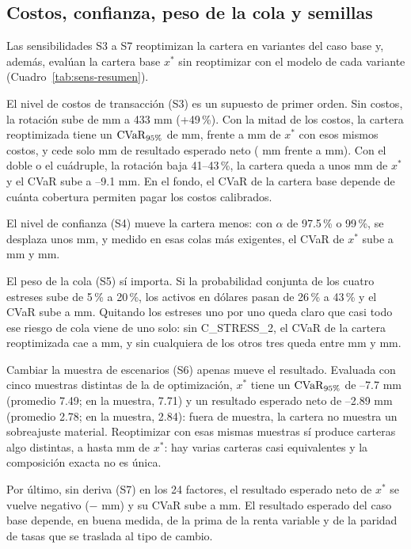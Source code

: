 

\subsection{Costos, confianza, peso de la cola y semillas}
Las sensibilidades S3 a S7 reoptimizan la cartera en variantes del caso base y, además, evalúan la cartera
base $x^*$ sin reoptimizar con el modelo de cada variante (Cuadro~\ref{tab:sens-resumen}).

El nivel de costos de transacción (S3) es un supuesto de primer orden. Sin costos, la rotación sube de
 mm a 433 mm (+49\,\%). Con la mitad de los costos, la cartera reoptimizada tiene un
$\operatorname{CVaR}_{95\%}$ de  mm, frente a  mm de $x^*$ con esos mismos costos, y cede solo  mm
de resultado esperado neto ( mm frente a  mm). Con el doble o el cuádruple, la rotación baja 41--43\,\%, la cartera queda a unos  mm de
$x^*$ y el CVaR sube a --9.1 mm. En el fondo, el CVaR de la cartera base depende de cuánta cobertura
permiten pagar los costos calibrados.

El nivel de confianza (S4) mueve la cartera menos: con $\alpha$ de 97.5\,\% o 99\,\%, se desplaza unos
 mm, y medido en esas colas más exigentes, el CVaR de $x^*$ sube a  mm y  mm.

El peso de la cola (S5) sí importa. Si la probabilidad conjunta de los cuatro estreses sube de 5\,\% a
20\,\%, los activos en dólares pasan de 26\,\% a 43\,\% y el CVaR sube a  mm. Quitando los estreses
uno por uno queda claro que casi todo ese riesgo de cola viene de uno solo: sin C\_STRESS\_2, el CVaR de la
cartera reoptimizada cae a  mm, y sin cualquiera de los otros tres queda entre  mm y
 mm.



Cambiar la muestra de escenarios (S6) apenas mueve el resultado. Evaluada con cinco muestras distintas de la
de optimización, $x^*$ tiene un $\operatorname{CVaR}_{95\%}$ de --7.7 mm (promedio 7.49; en la muestra, 7.71) y un
resultado esperado neto de --2.89 mm (promedio 2.78; en la muestra, 2.84): fuera de muestra, la
cartera no muestra un sobreajuste material. Reoptimizar con esas mismas muestras sí produce carteras algo
distintas, a hasta  mm de $x^*$: hay varias carteras casi equivalentes y la composición exacta no es
única.

Por último, sin deriva (S7) en los 24 factores, el resultado esperado neto de $x^*$ se vuelve negativo
(\mbox{$-$} mm) y su CVaR sube a  mm. El resultado esperado del caso base depende, en buena
medida, de la prima de la renta variable y de la paridad de tasas que se traslada al tipo de cambio.

